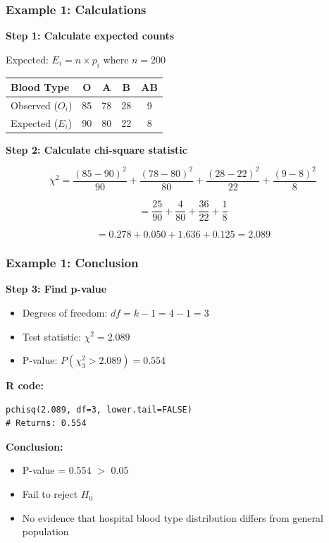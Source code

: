 \documentclass{beamer}
\begin{document}
\begin{frame}
\frametitle{Example 1: Calculations}
\textbf{Step 1: Calculate expected counts}

Expected: $E_i = n \times p_i$ where $n = 200$

\begin{center}
\begin{tabular}{lcccc}
\toprule
Blood Type & O & A & B & AB \\
\midrule
Observed ($O_i$) & 85 & 78 & 28 & 9 \\
Expected ($E_i$) & 90 & 80 & 22 & 8 \\
\bottomrule
\end{tabular}
\end{center}

\vspace{0.5cm}
\textbf{Step 2: Calculate chi-square statistic}

$$\chi^2 = \frac{(85-90)^2}{90} + \frac{(78-80)^2}{80} + \frac{(28-22)^2}{22} + \frac{(9-8)^2}{8}$$

$$= \frac{25}{90} + \frac{4}{80} + \frac{36}{22} + \frac{1}{8}$$

$$= 0.278 + 0.050 + 1.636 + 0.125 = 2.089$$
\end{frame}

\begin{frame}[fragile]
\frametitle{Example 1: Conclusion}
\textbf{Step 3: Find p-value}

\begin{itemize}
\item Degrees of freedom: $df = k - 1 = 4 - 1 = 3$
\item Test statistic: $\chi^2 = 2.089$
\item P-value: $P(\chi^2_3 > 2.089) = 0.554$
\end{itemize}

\vspace{0.5cm}
\textbf{R code:}
\begin{verbatim}
pchisq(2.089, df=3, lower.tail=FALSE)
# Returns: 0.554
\end{verbatim}

\vspace{0.5cm}
\textbf{Conclusion:}
\begin{itemize}
\item P-value = 0.554 $>$ 0.05
\item Fail to reject $H_0$
\item No evidence that hospital blood type distribution differs from general population
\end{itemize}
\end{frame}
\end{document}
